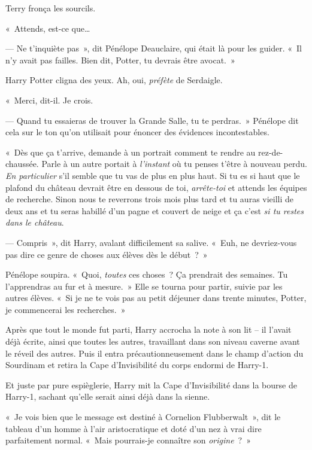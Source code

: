 Terry fronça les sourcils.

«~Attends, est-ce que…

--- Ne t'inquiète pas~», dit Pénélope Deauclaire, qui était là pour les guider. «~Il n'y avait pas failles. Bien dit, Potter, tu devrais être avocat.~»

Harry Potter cligna des yeux. Ah, oui, \emph{préfète} de Serdaigle.

«~Merci, dit-il. Je crois.

--- Quand tu essaieras de trouver la Grande Salle, tu te perdras.~» Pénélope dit cela sur le ton qu'on utilisait pour énoncer des évidences incontestables.

«~Dès que ça t'arrive, demande à un portrait comment te rendre au rez-de-chaussée. Parle à un autre portait à \emph{l'instant} où tu penses t'être à nouveau perdu. \emph{En particulier} s'il semble que tu vas de plus en plus haut. Si tu es si haut que le plafond du château devrait être en dessous de toi, \emph{arrête-toi} et attends les équipes de recherche. Sinon nous te reverrons trois mois plus tard et tu auras vieilli de deux ans et tu seras habillé d'un pagne et couvert de neige et ça c'est \emph{si tu restes dans le château}.

--- Compris~», dit Harry, avalant difficilement sa salive. «~Euh, ne devriez-vous pas dire ce genre de choses aux élèves dès le début~?~»

Pénélope soupira. «~Quoi, \emph{toutes} ces choses~? Ça prendrait des semaines. Tu l'apprendras au fur et à mesure.~» Elle se tourna pour partir, suivie par les autres élèves. «~Si je ne te vois pas au petit déjeuner dans trente minutes, Potter, je commencerai les recherches.~»

Après que tout le monde fut parti, Harry accrocha la note à son lit -- il l'avait déjà écrite, ainsi que toutes les autres, travaillant dans son niveau caverne avant le réveil des autres. Puis il entra précautionneusement dans le champ d'action du Sourdinam et retira la Cape d'Invisibilité du corps endormi de Harry-1.

Et juste par pure espièglerie, Harry mit la Cape d'Invisibilité dans la bourse de Harry-1, sachant qu'elle serait ainsi déjà dans la sienne.

\later

«~Je vois bien que le message est destiné à Cornelion Flubberwalt~», dit le tableau d'un homme à l'air aristocratique et doté d'un nez à vrai dire parfaitement normal. «~Mais pourrais-je connaître son \emph{origine}~?~»

